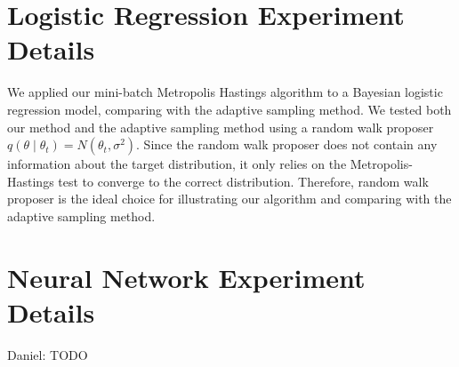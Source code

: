 \documentclass{article}
\begin{document}
\section{Logistic Regression Experiment Details}\label{app:logistic}

We applied our mini-batch Metropolis Hastings algorithm to a Bayesian logistic regression model, comparing with the adaptive sampling method. We tested both our method and the adaptive sampling method using a random walk proposer $q(\theta \mid \theta_t) = N (\theta_t, \sigma^2)$. Since the random walk proposer does not contain any information about the target distribution, it only relies on the Metropolis-Hastings test to converge to the correct distribution. Therefore, random walk proposer is the ideal choice for illustrating our algorithm and comparing with the adaptive sampling method.

\section{Neural Network Experiment Details}\label{app:nnet}

{\color{blue}
Daniel: TODO
}

\end{document}

